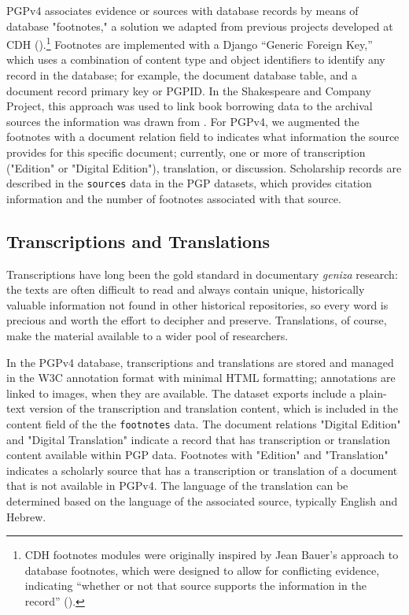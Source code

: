 \documentclass{article}
\begin{document}
PGPv4 associates evidence or sources with database records by means of database "footnotes," a solution  we adapted from previous projects developed at CDH (\citeyear{koeser_princeton-cdhmep-django_2022, koeser_derrida-django_2021}).\footnote{CDH footnotes modules were originally inspired by Jean Bauer’s approach to database footnotes, which were designed to allow for conflicting evidence, indicating “whether or not that source supports the information in the record” (\citeyear{noauthor_tales_2012}).} Footnotes are implemented with a Django “Generic Foreign Key,” which uses a combination of content type and object identifiers to identify any record in the database; for example, the document database table, and a document record primary key or PGPID. In the Shakespeare and Company Project, this approach was used to link book borrowing data to the archival sources the information was drawn from \autocite[18]{kotin_shakespeare_2022}. For PGPv4, we augmented the footnotes with a document relation field to indicates what information the source provides for this specific document; currently, one or more of  transcription ("Edition" or "Digital Edition"), translation, or discussion. Scholarship records are described in the \texttt{sources} data in the PGP datasets, which provides citation information and the number of footnotes associated with that source.

\subsection{Transcriptions and Translations}
Transcriptions have long been the gold standard in documentary \textit{geniza }research: the texts are often difficult to read and always contain unique, historically valuable information not found in other historical repositories, so every word is precious and worth the effort to decipher and preserve. Translations, of course, make the material available to a wider pool of researchers. 

In the PGPv4 database, transcriptions and translations are stored and managed in the W3C annotation format with minimal HTML formatting; annotations are linked to images, when they are available. The dataset exports include a plain-text version of the transcription and translation content, which is included in the content field of the the \texttt{footnotes} data. The document relations "Digital Edition" and "Digital Translation" indicate a record that has  transcription or translation content available within PGP data. Footnotes with "Edition" and "Translation" indicates a scholarly source that has a transcription or translation of a document that is not available in PGPv4. The language of the translation can be determined based on the language of the associated source, typically English and Hebrew.
\end{document}
